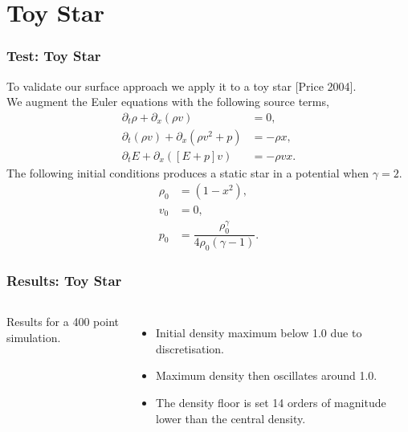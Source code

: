 \documentclass{beamer}
\begin{document}
\section{Toy Star}
\begin{frame}
\frametitle{Test: Toy Star}
To validate our surface approach we apply it to a toy star [Price 2004].\\
We augment the Euler equations with the following source terms,
\begin{align}
\partial_t \rho + \partial_x (\rho v) &= 0,\\
\partial_t (\rho v) + \partial_x(\rho v^2 + p) &= -\rho x, \\
\partial_t E + \partial_x([E+p]v) &= -\rho v x.
\end{align}
The following initial conditions produces a static star in a potential when $\gamma = 2$.
\begin{align}
\rho_0 &= (1-x^2),\\
v_0 &= 0, \\
p_0   &= \dfrac{\rho_0^\gamma }{4\rho_0(\gamma-1)}.
\end{align}
\end{frame}

\begin{frame}
\frametitle{Results: Toy Star}
\begin{columns}
\column{7.5cm}
\centering
\column{4.5cm}
Results for a 400 point simulation. 
\begin{itemize}
\item{Initial density maximum below 1.0 due to discretisation.}
\item{Maximum density then oscillates around 1.0.}
\item{The density floor is set 14 orders of magnitude lower than the central density.}
\end{itemize}
\end{columns}
\end{frame}
\end{document}
